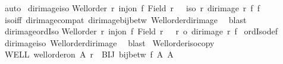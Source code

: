 \begin{isabellebody}
\ auto%
\endisatagproof
{\isafoldproof}%
%
\isadelimproof
\isanewline
%
\endisadelimproof
\isanewline
{}\isamarkupfalse%
\ dir{\isacharunderscore}{\kern0pt}image{\isacharunderscore}{\kern0pt}iso{\isacharcolon}{\kern0pt}\isanewline
{\isachardoublequoteopen}{\isasymlbrakk}Well{\isacharunderscore}{\kern0pt}order\ r{\isacharsemicolon}{\kern0pt}\ inj{\isacharunderscore}{\kern0pt}on\ f\ {\isacharparenleft}{\kern0pt}Field\ r{\isacharparenright}{\kern0pt}{\isasymrbrakk}\ \ {\isasymLongrightarrow}\ iso\ r\ {\isacharparenleft}{\kern0pt}dir{\isacharunderscore}{\kern0pt}image\ r\ f{\isacharparenright}{\kern0pt}\ f{\isachardoublequoteclose}\isanewline
%
\isadelimproof
%
\endisadelimproof
%
\isatagproof
{}\isamarkupfalse%
\ iso{\isacharunderscore}{\kern0pt}iff{}\ dir{\isacharunderscore}{\kern0pt}image{\isacharunderscore}{\kern0pt}compat\ dir{\isacharunderscore}{\kern0pt}image{\isacharunderscore}{\kern0pt}bij{\isacharunderscore}{\kern0pt}betw\ Well{\isacharunderscore}{\kern0pt}order{\isacharunderscore}{\kern0pt}dir{\isacharunderscore}{\kern0pt}image\ \isamarkupfalse%
\ blast%
\endisatagproof
{\isafoldproof}%
%
\isadelimproof
\isanewline
%
\endisadelimproof
\isanewline
{}\isamarkupfalse%
\ dir{\isacharunderscore}{\kern0pt}image{\isacharunderscore}{\kern0pt}ordIso{\isacharcolon}{\kern0pt}\isanewline
{\isachardoublequoteopen}{\isasymlbrakk}Well{\isacharunderscore}{\kern0pt}order\ r{\isacharsemicolon}{\kern0pt}\ inj{\isacharunderscore}{\kern0pt}on\ f\ {\isacharparenleft}{\kern0pt}Field\ r{\isacharparenright}{\kern0pt}{\isasymrbrakk}\ \ {\isasymLongrightarrow}\ r\ {\isacharequal}{\kern0pt}o\ dir{\isacharunderscore}{\kern0pt}image\ r\ f{\isachardoublequoteclose}\isanewline
%
\isadelimproof
%
\endisadelimproof
%
\isatagproof
{}\isamarkupfalse%
\ ordIso{\isacharunderscore}{\kern0pt}def\ \isamarkupfalse%
\ dir{\isacharunderscore}{\kern0pt}image{\isacharunderscore}{\kern0pt}iso\ Well{\isacharunderscore}{\kern0pt}order{\isacharunderscore}{\kern0pt}dir{\isacharunderscore}{\kern0pt}image\ \isamarkupfalse%
\ blast%
\endisatagproof
{\isafoldproof}%
%
\isadelimproof
\isanewline
%
\endisadelimproof
\isanewline
{}\isamarkupfalse%
\ Well{\isacharunderscore}{\kern0pt}order{\isacharunderscore}{\kern0pt}iso{\isacharunderscore}{\kern0pt}copy{\isacharcolon}{\kern0pt}\isanewline
{}\ WELL{\isacharcolon}{\kern0pt}\ {\isachardoublequoteopen}well{\isacharunderscore}{\kern0pt}order{\isacharunderscore}{\kern0pt}on\ A\ r{\isachardoublequoteclose}\ \ BIJ{\isacharcolon}{\kern0pt}\ {\isachardoublequoteopen}bij{\isacharunderscore}{\kern0pt}betw\ f\ A\ A{\isacharprime}{\kern0pt}{\isachardoublequoteclose}\isanewline

\end{isabellebody}
